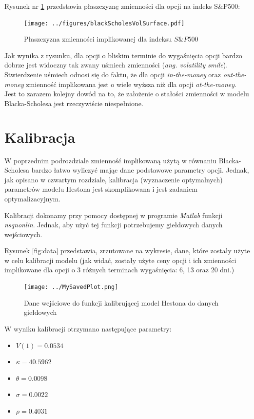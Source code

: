 \documentclass{pracamgr}
\begin{document}
Rysunek nr \ref{fig:volatilitySurface} przedstawia płaszczyznę zmienności dla 
opcji na indeks S\&P500:

\begin{figure}
  \centering
  \texttt{[image: ../figures/blackScholesVolSurface.pdf]}
  \caption{Płaszczyzna zmienności implikowanej dla indeksu $S\&P$500}
  \label{fig:volatilitySurface}
\end{figure}

Jak wynika z rysunku, dla opcji o bliskim terminie do wygaśnięcia opcji bardzo dobrze jest widoczny
tak zwany uśmiech zmienności (\textit{ang. volatility smile}). Stwierdzenie uśmiech 
odnosi się do faktu, że dla opcji \textit{in-the-money} oraz \textit{out-the-money}
zmienność implikowana jest o wiele wyższa niż dla opcji \textit{at-the-money}.
Jest to zarazem kolejny dowód na to, że założenie o stałości zmienności w modelu Blacka-Scholesa jest rzeczywiście niespełnione.


\section{Kalibracja}

W poprzednim podrozdziale zmienność implikowaną użytą w równaniu Blacka-Scholesa bardzo łatwo 
wyliczyć mając dane podstawowe parametry opcji. Jednak, jak opisano w czwartym rozdziale, 
kalibracja (wyznaczenie optymalnych) parametrów modelu Hestona jest skomplikowana i jest
zadaniem optymalizacyjnym.  

Kalibracji dokonamy przy pomocy dostępnej w programie \textit{Matlab} funkcji \textit{nsqnonlin}.
Jednak, aby użyć tej funkcji potrzebujemy giełdowych danych wejściowych.


Rysunek \ref{fig:data} przedstawia, zrzutowane na wykresie, dane, które
zostały użyte w celu kalibracji modelu (jak widać, zostały użyte ceny 
opcji i ich zmienności implikowane dla opcji o 3 różnych terminach wygaśnięcia: 
6, 13 oraz 20 dni.)

\begin{figure}
  \centering
  \texttt{[image: ../MySavedPlot.png]}
  \caption{Dane wejściowe do funkcji kalibrującej model Hestona do danych giełdowych}
  \label{fig:calibration}
\end{figure}

W wyniku kalibracji otrzymano następujące parametry:


\begin{itemize}
  \item $V(1) = 0.0534 $
  \item $\kappa = 40.5962$
  \item $\theta = 0.0098$
  \item $\sigma = 0.0022$
  \item $\rho = 0.4031$
\end{itemize}
\end{document}
